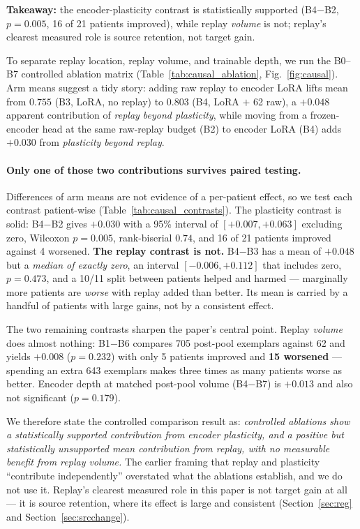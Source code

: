 \textbf{Takeaway:} the encoder-plasticity contrast is statistically supported
(B4$-$B2, $p=0.005$, 16 of 21 patients improved), while replay \emph{volume} is
not; replay's clearest measured role is source retention, not target gain.

To separate replay location, replay volume, and trainable depth, we run the
B0--B7 controlled ablation matrix (Table~\ref{tab:causal_ablation},
Fig.~\ref{fig:causal}).
Arm means suggest a tidy story: adding raw replay to encoder LoRA lifts mean
\macrof{} from $0.755$ (B3, LoRA, no replay) to $0.803$ (B4, LoRA $+$ 62 raw), a
$+0.048$ apparent contribution of \emph{replay beyond plasticity}, while moving
from a frozen-encoder head at the same raw-replay budget (B2) to encoder LoRA
(B4) adds $+0.030$ from \emph{plasticity beyond replay}.

\paragraph{Only one of those two contributions survives paired testing.}
Differences of arm means are not evidence of a per-patient effect, so we test
each contrast patient-wise (Table~\ref{tab:causal_contrasts}). The plasticity
contrast is solid: B4$-$B2 gives $+0.030$ with a 95\% interval of
$[+0.007,+0.063]$ excluding zero, Wilcoxon $p = 0.005$, rank-biserial $0.74$, and
16 of 21 patients improved against 4 worsened. \textbf{The replay contrast is
not.} B4$-$B3 has a mean of $+0.048$ but a \emph{median of exactly zero}, an
interval $[-0.006,+0.112]$ that includes zero, $p = 0.473$, and a 10/11 split
between patients helped and harmed --- marginally more patients are \emph{worse}
with replay added than better. Its mean is carried by a handful of patients with
large gains, not by a consistent effect.

The two remaining contrasts sharpen the paper's central point. Replay
\emph{volume} does almost nothing: B1$-$B6 compares 705 post-pool exemplars
against 62 and yields $+0.008$ ($p = 0.232$) with only 5 patients improved and
\textbf{15 worsened} --- spending an extra 643 exemplars makes three times as
many patients worse as better. Encoder depth at matched post-pool volume
(B4$-$B7) is $+0.013$ and also not significant ($p = 0.179$).

We therefore state the controlled comparison result as: \emph{controlled ablations show a
statistically supported contribution from encoder plasticity, and a positive but
statistically unsupported mean contribution from replay, with no measurable
benefit from replay volume.} The earlier framing that replay and plasticity
``contribute independently'' overstated what the ablations establish, and we do
not use it. Replay's clearest measured role in this paper is not target gain at
all --- it is source retention, where its effect is large and consistent
(Section~\ref{sec:reg} and Section~\ref{sec:srcchange}).

